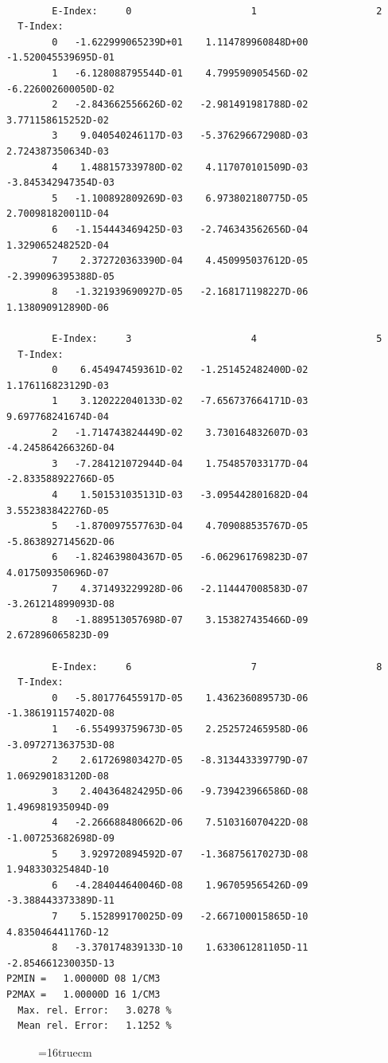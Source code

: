 \documentclass[12pt,dvipdfmx]{article}
\begin{document}
\begin{small}\begin{verbatim}

        E-Index:     0                     1                     2
  T-Index:
        0   -1.622999065239D+01    1.114789960848D+00   -1.520045539695D-01
        1   -6.128088795544D-01    4.799590905456D-02   -6.226002600050D-02
        2   -2.843662556626D-02   -2.981491981788D-02    3.771158615252D-02
        3    9.040540246117D-03   -5.376296672908D-03    2.724387350634D-03
        4    1.488157339780D-02    4.117070101509D-03   -3.845342947354D-03
        5   -1.100892809269D-03    6.973802180775D-05    2.700981820011D-04
        6   -1.154443469425D-03   -2.746343562656D-04    1.329065248252D-04
        7    2.372720363390D-04    4.450995037612D-05   -2.399096395388D-05
        8   -1.321939690927D-05   -2.168171198227D-06    1.138090912890D-06

        E-Index:     3                     4                     5
  T-Index:
        0    6.454947459361D-02   -1.251452482400D-02    1.176116823129D-03
        1    3.120222040133D-02   -7.656737664171D-03    9.697768241674D-04
        2   -1.714743824449D-02    3.730164832607D-03   -4.245864266326D-04
        3   -7.284121072944D-04    1.754857033177D-04   -2.833588922766D-05
        4    1.501531035131D-03   -3.095442801682D-04    3.552383842276D-05
        5   -1.870097557763D-04    4.709088535767D-05   -5.863892714562D-06
        6   -1.824639804367D-05   -6.062961769823D-07    4.017509350696D-07
        7    4.371493229928D-06   -2.114447008583D-07   -3.261214899093D-08
        8   -1.889513057698D-07    3.153827435466D-09    2.672896065823D-09

        E-Index:     6                     7                     8
  T-Index:
        0   -5.801776455917D-05    1.436236089573D-06   -1.386191157402D-08
        1   -6.554993759673D-05    2.252572465958D-06   -3.097271363753D-08
        2    2.617269803427D-05   -8.313443339779D-07    1.069290183120D-08
        3    2.404364824295D-06   -9.739423966586D-08    1.496981935094D-09
        4   -2.266688480662D-06    7.510316070422D-08   -1.007253682698D-09
        5    3.929720894592D-07   -1.368756170273D-08    1.948330325484D-10
        6   -4.284044640046D-08    1.967059565426D-09   -3.388443373389D-11
        7    5.152899170025D-09   -2.667100015865D-10    4.835046441176D-12
        8   -3.370174839133D-10    1.633061281105D-11   -2.854661230035D-13
P2MIN =   1.00000D 08 1/CM3
P2MAX =   1.00000D 16 1/CM3
  Max. rel. Error:   3.0278 %
  Mean rel. Error:   1.1252 %

\end{verbatim}\end{small}
\begin{figure} \label{2.2.14e}
\epsfxsize=16truecm
\end{figure}
\newpage
\end{document}
